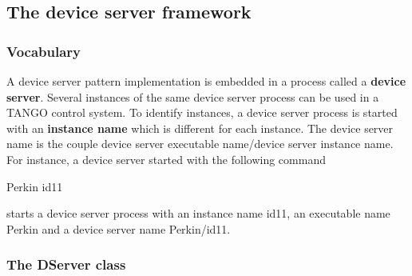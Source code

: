 \subsection{The device server framework}


\subsubsection{Vocabulary\label{Voc}}

A device server pattern implementation is embedded
in a process called a \textbf{device server}. Several instances of
the same device server process can be used in a TANGO control system.
To identify instances, a device server process is started with an
\textbf{instance name} which is different for each instance. The device
server name is the couple device server executable
name/device server instance name. For instance, a
device server started with the following command \begin{center}Perkin
id11\end{center} starts a device server process with an instance
name id11, an executable name Perkin and a device server name Perkin/id11.


\subsubsection{The DServer class\label{DServer_class}}

